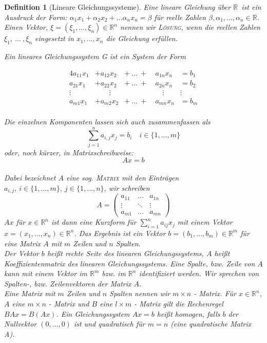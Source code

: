 \documentclass{report}
\newcommand{\IN}[1]{\index{#1|BH}}
\newcommand{\R}{\mathbb{R}}
\newcommand{\mR}{\(\mathbb{R}\)}
\newcommand{\Rn}{\mathbb{R}^n}
\theoremstyle{customrem}
\theoremstyle{customdef}
\newtheorem*{definitionn}{Definition} %
\theoremstyle{customenv}
\newcommand{\defemph}[1]{\textsc{#1}}
\begin{document}
	\begin{definitionn}[Lineare Gleichungssysteme]
		\IN{Lineare Gleichungssysteme}
		\label{deflingl}
		Eine lineare Gleichung über \mR\ ist ein Ausdruck der Form: \(\alpha_1x_1 + \alpha_2 x_2 + \dots \alpha_n x_n = \beta\) für reelle Zahlen \(\beta, \alpha_1, \dots, \alpha_n \in \R\). Einen Vektor, \(\xi = \left(\xi_1, \dots, \xi_n\right) \in \Rn\) nennen wir \defemph{Lösung}, wenn die reellen Zahlen  \(\xi_1, \ \dots\ , \xi_n\) eingesetzt in \(x_1, \dots, x_n\) die Gleichung erfüllen. \pagebreak[3]
		
		Ein lineares Gleichungssystem G ist ein System der Form
		
		\begin{alignat*}{4}
			a_{11} x_1	&+ a_{12}x_2	&+\ \dots\ +\	& a_{1n} x_n	&= b_1\\
			a_{21} x_1 	&+ a_{22}x_2 	&+\ \dots\ +\	& a_{2n} x_n	&= b_2\\
			\vdots\quad & \qquad\vdots	& 				&\quad\vdots	& \vdots\ \\
			a_{m1} x_1 	&+ a_{m2} x_2  	&+\ \dots\ +\	& a_{mn} x_n	&= b_m\\
		\end{alignat*}
		
		 Die einzelnen Komponenten lassen sich auch zusammenfassen als \[\sum_{j=1}^n a_{i,j} x_j = b_i \quad i\in\{1,\dots,m\}\]
		oder, noch kürzer, in Matrixschreibweise:
		\[Ax=b\]\\
		Dabei bezeichnet \(A\) eine sog. \defemph{Matrix} mit den Einträgen \(a_{i,j},\ i\in\{1, \dots , m\},\ j\in\{1, \dots, n\}\), wir schreiben\\
		\[A =
			\begin{pmatrix}
				a_{11} & \dots  & a_{1n}\\
				\vdots & \ddots & \vdots\\
				a_{m1} & \dots  & a_{mn}
			\end{pmatrix}
		\]
		\(Ax\) für \(x \in \Rn\) ist dann eine Kurzform für \(\sum_{i=1}^na_{ij}x_j\) mit einem Vektor \(x = (x_1, \dots, x_n) \in \Rn\). Das Ergebnis ist ein Vektor \(b = (b_1, \dots, b_m) \in \R^m\) für eine Matrix \(A\) mit \(m\) Zeilen und \(n\) Spalten.\\
		Der Vektor \(b\) heißt rechte Seite des linearen Gleichungssystems, \(A\) heißt Koeffizientenmatrix des linearen Gleichungssystems. Eine Spalte, bzw. Zeile von \(A\) kann mit einem Vektor im \(\R^m\) bzw. im \(\R^n\) identifiziert werden. Wir sprechen von Spalten-, bzw. Zeilenvektoren der Matrix \(A\).\\
		
		Eine Matrix mit \(m\) Zeilen und \(n\) Spalten nennen wir \(m\times n\) - Matrix. Für \(x  \in \Rn \), \(A\) eine \(m\times n\) - Matrix und \(B\) eine \(l\times m\) - Matrix gilt die Rechenregel \(BAx = B(Ax)\). Ein Gleichungssystem \(Ax=b\) heißt homogen, falls \(b\) der Nullvektor \((0, \dots, 0)\) ist und quadratisch für  \(m = n\) (eine quadratische Matrix A).\\
	\end{definitionn}
	
\end{document}
